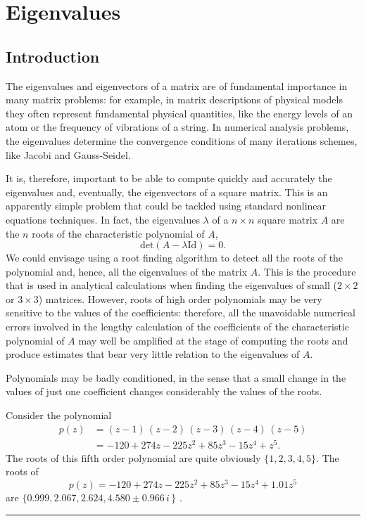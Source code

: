 
\chapter[Eigenvalues]{Eigenvalues}

\section{Introduction}

The eigenvalues and eigenvectors of a matrix are of fundamental
importance in many matrix problems: for example, in matrix
descriptions of physical models they often represent fundamental
physical quantities, like the energy levels of an atom or the
frequency of vibrations of a string.  In numerical analysis problems,
the eigenvalues determine the convergence conditions of many
iterations schemes, like Jacobi and Gauss-Seidel.

It is, therefore, important to be able to compute quickly and
accurately the eigenvalues and, eventually, the eigenvectors of a
square matrix.  This is an apparently simple problem that could be
tackled using standard nonlinear equations techniques.  In fact, the
eigenvalues $\lambda$ of a $n \times n$ square matrix $A$ are the $n$
roots of the characteristic polynomial of $A$,
%
\begin{equation*}
 \text{det}(A - \lambda \text{Id}) = 0 .
\end{equation*}
%
We could envisage using a root finding algorithm to detect all the
roots of the polynomial and, hence, all the eigenvalues of the matrix
$A$.  This is the procedure that is used in analytical calculations
when finding the eigenvalues of small ($2 \times 2$ or $3 \times 3$)
matrices.  However, roots of high order polynomials may be very
sensitive to the values of the coefficients: therefore, all the
unavoidable numerical errors involved in the lengthy calculation of
the coefficients of the characteristic polynomial of $A$ may well be
amplified at the stage of computing the roots and produce estimates
that bear very little relation to the eigenvalues of $A$.

\begin{Example}
  Polynomials may be badly conditioned, in the sense that a small
  change in the values of just one coefficient changes considerably
  the values of the roots.
\end{Example}

Consider the polynomial
%
\begin{align*}
 p(z) &= (z-1)\,(z-2)\,(z-3)\,(z-4)\,(z-5) \\
      &= -120 + 274 z - 225 z^2 + 85 z^3 - 15 z^4 + z^5 .
\end{align*}
%
The roots of this fifth order polynomial are quite obviously
$\{1,2,3,4,5\}$.  The roots of
%
\begin{equation*}
  p(z) = -120 + 274 z - 225 z^2 + 85 z^3 - 15 z^4 + 1.01 z^5
\end{equation*}
%
are $\{ 0.999, 2.067, 2.624, 4.580 \pm 0.966 \, i \, \}$ . \hfill
\rule{3mm}{3mm}

